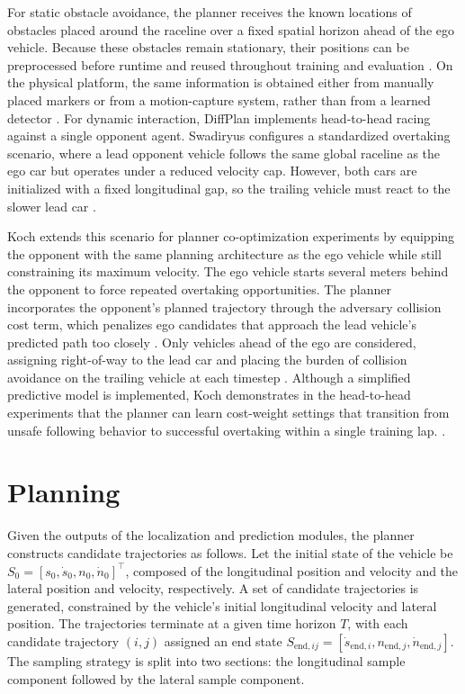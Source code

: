 For static obstacle avoidance, the planner receives the known locations of obstacles placed around the raceline over a fixed spatial horizon ahead of the ego vehicle.
Because these obstacles remain stationary, their positions can be preprocessed before runtime and reused throughout training and evaluation \cite{swadiryus_DifferentiableMotionPlanning_2025}.
On the physical platform, the same information is obtained either from manually placed markers or from a motion-capture system, rather than from a learned detector \cite{swadiryus_DifferentiableMotionPlanning_2025}.
For dynamic interaction, DiffPlan implements head-to-head racing against a single opponent agent.
Swadiryus \cite{swadiryus_DifferentiableMotionPlanning_2025} configures a standardized overtaking scenario, where a lead opponent vehicle follows the same global raceline as the ego car but operates under a reduced velocity cap.
However, both cars are initialized with a fixed longitudinal gap, so the trailing vehicle must react to the slower lead car \cite{swadiryus_DifferentiableMotionPlanning_2025}.

Koch \cite{koch_DifferentiableInterpretablePath_2025} extends this scenario for planner co-optimization experiments by equipping the opponent with the same planning architecture as the ego vehicle while still constraining its maximum velocity.
The ego vehicle starts several meters behind the opponent to force repeated overtaking opportunities.
The planner incorporates the opponent's planned trajectory through the adversary collision cost term, which penalizes ego candidates that approach the lead vehicle's predicted path too closely \cite{koch_DifferentiableInterpretablePath_2025, swadiryus_DifferentiableMotionPlanning_2025}.
Only vehicles ahead of the ego are considered, assigning right-of-way to the lead car and placing the burden of collision avoidance on the trailing vehicle at each timestep \cite{koch_DifferentiableInterpretablePath_2025}.
Although a simplified predictive model is implemented, Koch demonstrates in the head-to-head experiments that the planner can learn cost-weight settings that transition from unsafe following behavior to successful overtaking within a single training lap. \cite{koch_DifferentiableInterpretablePath_2025}.

\section{Planning}
\label{section:DiffPlanPlanning}

Given the outputs of the localization and prediction modules, the planner constructs candidate trajectories as follows.
Let the initial state of the vehicle be $S_0 = [s_0, \dot{s}_0, n_0, \dot{n}_0]^{\top}$, composed of the longitudinal position and velocity and the lateral position and velocity, respectively.
A set of candidate trajectories is generated, constrained by the vehicle's initial longitudinal velocity and lateral position.
The trajectories terminate at a given time horizon $T$, with each candidate trajectory $(i,j)$ assigned an end state $S_{\text{end}, ij} = [\dot{s}_{\text{end}, i}, n_{\text{end}, j}, \dot{n}_{\text{end}, j}]$.
The sampling strategy is split into two sections: the longitudinal sample component followed by the lateral sample component.
 
